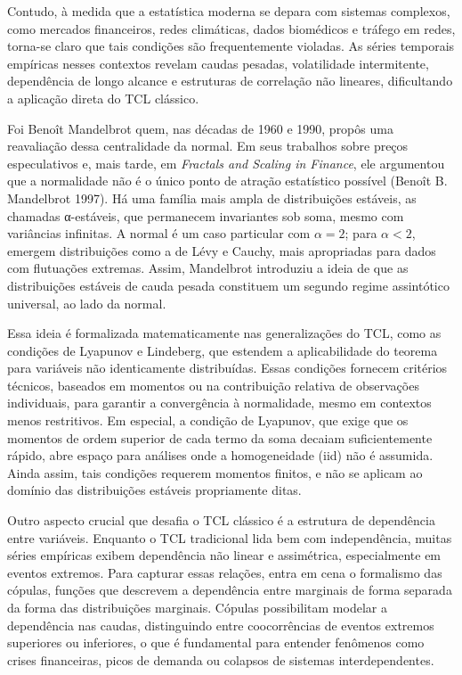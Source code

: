 \documentclass[
  letterpaper,
  DIV=11,
  numbers=noendperiod]{scrartcl}
\begin{document}
Contudo, à medida que a estatística moderna se depara com sistemas
complexos, como mercados financeiros, redes climáticas, dados biomédicos
e tráfego em redes, torna-se claro que tais condições são frequentemente
violadas. As séries temporais empíricas nesses contextos revelam caudas
pesadas, volatilidade intermitente, dependência de longo alcance e
estruturas de correlação não lineares, dificultando a aplicação direta
do TCL clássico.

Foi Benoît Mandelbrot quem, nas décadas de 1960 e 1990, propôs uma
reavaliação dessa centralidade da normal. Em seus trabalhos sobre preços
especulativos e, mais tarde, em \emph{Fractals and Scaling in Finance},
ele argumentou que a normalidade não é o único ponto de atração
estatístico possível (Benoît B. Mandelbrot 1997). Há uma família mais
ampla de distribuições estáveis, as chamadas α-estáveis, que permanecem
invariantes sob soma, mesmo com variâncias infinitas. A normal é um caso
particular com \(\alpha = 2\); para \(\alpha < 2\), emergem
distribuições como a de Lévy e Cauchy, mais apropriadas para dados com
flutuações extremas. Assim, Mandelbrot introduziu a ideia de que as
distribuições estáveis de cauda pesada constituem um segundo regime
assintótico universal, ao lado da normal.

Essa ideia é formalizada matematicamente nas generalizações do TCL, como
as condições de Lyapunov e Lindeberg, que estendem a aplicabilidade do
teorema para variáveis não identicamente distribuídas. Essas condições
fornecem critérios técnicos, baseados em momentos ou na contribuição
relativa de observações individuais, para garantir a convergência à
normalidade, mesmo em contextos menos restritivos. Em especial, a
condição de Lyapunov, que exige que os momentos de ordem superior de
cada termo da soma decaiam suficientemente rápido, abre espaço para
análises onde a homogeneidade (iid) não é assumida. Ainda assim, tais
condições requerem momentos finitos, e não se aplicam ao domínio das
distribuições estáveis propriamente ditas.

Outro aspecto crucial que desafia o TCL clássico é a estrutura de
dependência entre variáveis. Enquanto o TCL tradicional lida bem com
independência, muitas séries empíricas exibem dependência não linear e
assimétrica, especialmente em eventos extremos. Para capturar essas
relações, entra em cena o formalismo das cópulas, funções que descrevem
a dependência entre marginais de forma separada da forma das
distribuições marginais. Cópulas possibilitam modelar a dependência nas
caudas, distinguindo entre coocorrências de eventos extremos superiores
ou inferiores, o que é fundamental para entender fenômenos como crises
financeiras, picos de demanda ou colapsos de sistemas interdependentes.
\end{document}
